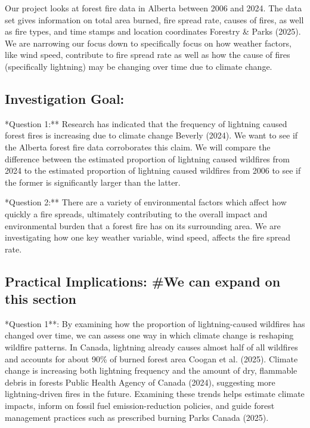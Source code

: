 \documentclass[
]{article}
\begin{document}
\indent Our project looks at forest fire data in Alberta between 2006
and 2024. The data set gives information on total area burned, fire
spread rate, causes of fires, as well as fire types, and time stamps and
location coordinates {Forestry \& Parks (2025)}. We are narrowing our
focus down to specifically focus on how weather factors, like wind
speed, contribute to fire spread rate as well as how the cause of fires
(specifically lightning) may be changing over time due to climate
change.

\subsection{Investigation Goal:}\label{investigation-goal}

\indent **Question 1:** Research has indicated that the frequency of
lightning caused forest fires is increasing due to climate change
{Beverly (2024)}. We want to see if the Alberta forest fire data
corroborates this claim. We will compare the difference between the
estimated proportion of lightning caused wildfires from 2024 to the
estimated proportion of lightning caused wildfires from 2006 to see if
the former is significantly larger than the latter.

\indent **Question 2:** There are a variety of environmental factors
which affect how quickly a fire spreads, ultimately contributing to the
overall impact and environmental burden that a forest fire has on its
surrounding area. We are investigating how one key weather variable,
wind speed, affects the fire spread rate.

\subsection{Practical Implications: \#We can expand on this
section}\label{practical-implications-we-can-expand-on-this-section}

\indent **Question 1**: By examining how the proportion of
lightning-caused wildfires has changed over time, we can assess one way
in which climate change is reshaping wildfire patterns. In Canada,
lightning already causes almost half of all wildfires and accounts for
about 90\% of burned forest area {Coogan et al. (2025)}. Climate change
is increasing both lightning frequency and the amount of dry, flammable
debris in forests {Public Health Agency of Canada (2024)}, suggesting
more lightning-driven fires in the future. Examining these trends helps
estimate climate impacts, inform on fossil fuel emission-reduction
policies, and guide forest management practices such as prescribed
burning {Parks Canada (2025)}.
\end{document}
